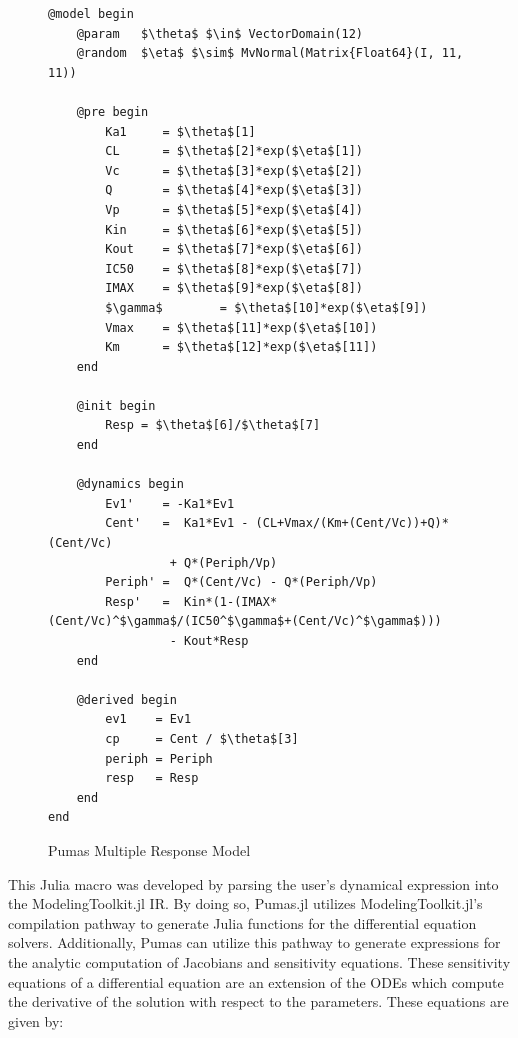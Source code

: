 \documentclass{juliacon}
\begin{document}
\begin{figure}
\begin{lstlisting}[mathescape=true]
@model begin
    @param   $\theta$ $\in$ VectorDomain(12)
    @random  $\eta$ $\sim$ MvNormal(Matrix{Float64}(I, 11, 11))

    @pre begin
        Ka1     = $\theta$[1]
        CL      = $\theta$[2]*exp($\eta$[1])
        Vc      = $\theta$[3]*exp($\eta$[2])
        Q       = $\theta$[4]*exp($\eta$[3])
        Vp      = $\theta$[5]*exp($\eta$[4])
        Kin     = $\theta$[6]*exp($\eta$[5])
        Kout    = $\theta$[7]*exp($\eta$[6])
        IC50    = $\theta$[8]*exp($\eta$[7])
        IMAX    = $\theta$[9]*exp($\eta$[8])
        $\gamma$        = $\theta$[10]*exp($\eta$[9])
        Vmax    = $\theta$[11]*exp($\eta$[10])
        Km      = $\theta$[12]*exp($\eta$[11])
    end

    @init begin
        Resp = $\theta$[6]/$\theta$[7]
    end

    @dynamics begin
        Ev1'    = -Ka1*Ev1
        Cent'   =  Ka1*Ev1 - (CL+Vmax/(Km+(Cent/Vc))+Q)*(Cent/Vc)  
                 + Q*(Periph/Vp)
        Periph' =  Q*(Cent/Vc) - Q*(Periph/Vp)
        Resp'   =  Kin*(1-(IMAX*(Cent/Vc)^$\gamma$/(IC50^$\gamma$+(Cent/Vc)^$\gamma$)))  
                 - Kout*Resp
    end

    @derived begin
        ev1    = Ev1
        cp     = Cent / $\theta$[3]
        periph = Periph
        resp   = Resp
    end
end
\end{lstlisting}
\caption{Pumas Multiple Response Model}
\label{code:Pumas}
\end{figure}

This Julia macro was developed by parsing the user's dynamical expression into the ModelingToolkit.jl IR. By doing so, Pumas.jl utilizes ModelingToolkit.jl's compilation pathway to generate Julia functions for the differential equation solvers. Additionally, Pumas can utilize this pathway to generate expressions for the analytic computation of Jacobians and sensitivity equations. These sensitivity equations of a differential equation are an extension of the ODEs which compute the derivative of the solution with respect to the parameters. These equations are given by:
\end{document}
